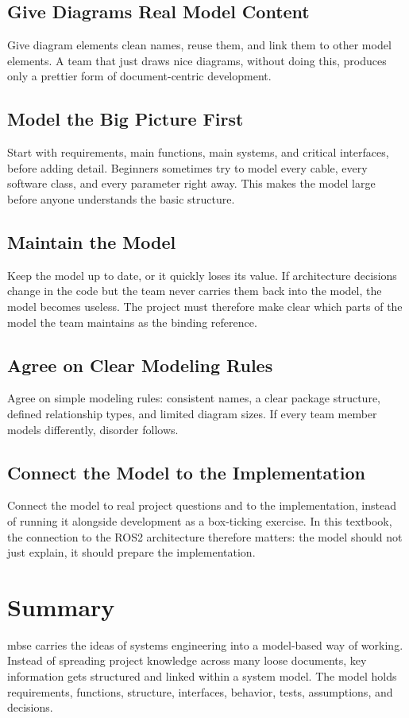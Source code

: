 \subsection{Give Diagrams Real Model Content}
Give diagram elements clean names, reuse them, and link them to other model elements. A team that just draws nice diagrams, without doing this, produces only a prettier form of document-centric development.

\subsection{Model the Big Picture First}
Start with requirements, main functions, main systems, and critical interfaces, before adding detail. Beginners sometimes try to model every cable, every software class, and every parameter right away. This makes the model large before anyone understands the basic structure.

\subsection{Maintain the Model}
Keep the model up to date, or it quickly loses its value. If architecture decisions change in the code but the team never carries them back into the model, the model becomes useless. The project must therefore make clear which parts of the model the team maintains as the binding reference.

\subsection{Agree on Clear Modeling Rules}
Agree on simple modeling rules: consistent names, a clear package structure, defined relationship types, and limited diagram sizes. If every team member models differently, disorder follows.

\subsection{Connect the Model to the Implementation}
Connect the model to real project questions and to the implementation, instead of running it alongside development as a box-ticking exercise. In this textbook, the connection to the ROS2 architecture therefore matters: the model should not just explain, it should prepare the implementation.

\section{Summary}
\gls{mbse} carries the ideas of systems engineering into a model-based way of working. Instead of spreading project knowledge across many loose documents, key information gets structured and linked within a system model. The model holds requirements, functions, structure, interfaces, behavior, tests, assumptions, and decisions.


